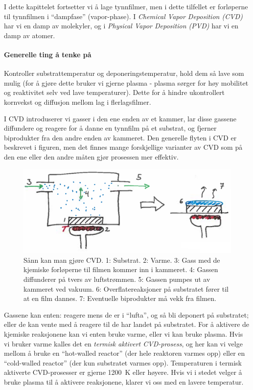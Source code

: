 I dette kapittelet fortsetter vi å lage tynnfilmer, men i dette tilfellet er forløperne til tynnfilmen i ``dampfase'' (vapor-phase). I \emph{Chemical Vapor Deposition (CVD)} har vi en damp av molekyler, og i \emph{Physical Vapor Deposition (PVD)} har vi en damp av atomer.

\paragraph{Generelle ting å tenke på}
Kontroller substrattemperatur og deponeringstemperatur, hold dem så lave som mulig (for å gjøre dette bruker vi gjerne plasma - plasma sørger for høy mobilitet og reaktivitet selv ved lave temperaturer). Dette for å hindre ukontrollert kornvekst og diffusjon mellom lag i flerlagsfilmer. 

I CVD introduserer vi gasser i den ene enden av et kammer, lar disse gassene diffundere og reagere for å danne en tynnfilm på et substrat, og fjerner biprodukter fra den andre enden av kammeret. Den generelle flyten i CVD er beskrevet i figuren, men det finnes mange forskjellige varianter av CVD som på den ene eller den andre måten gjør prosessen mer effektiv.

\begin{figure}[H]
\bmd\centering
\includegraphics[width=\linewidth]{metodefigs/cvd.png}
\caption{Sånn kan man gjøre CVD. 1: Substrat. 2: Varme. 3: Gass med de kjemiske forløperne til filmen kommer inn i kammeret. 4: Gassen diffunderer på tvers av luftstrømmen. 5: Gassen pumpes ut av kammeret ved vakuum. 6: Overflatereaksjoner på substratet fører til at en film dannes. 7: Eventuelle biprodukter må vekk fra filmen.}
\emd\end{figure}

Gassene kan enten: reagere mens de er i ``lufta'', og så bli deponert på substratet; eller de kan vente med å reagere til de har landet på substratet. For å aktivere de kjemiske reaksjonene kan vi enten bruke varme, eller vi kan bruke plasma. Hvis vi bruker varme kalles det en \emph{termisk aktivert CVD-prosess}, og her kan vi velge mellom å bruke en ``hot-walled reactor'' (der hele reaktoren varmes opp) eller en ``cold-walled reactor'' (der kun substratet varmes opp). Temperaturen i termisk aktiverte CVD-prosesser er gjerne \SI{1200}{\kelvin} eller høyere. Hvis vi i stedet velger å bruke plasma til å aktivere reaksjonene, klarer vi oss med en lavere temperatur.

